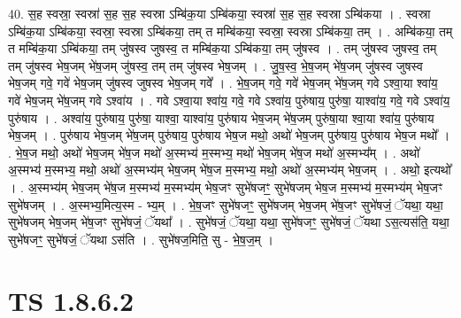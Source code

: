 \documentclass[17pt]{extarticle}
\begin{document}
40. स॒ह स्वस्रा॒ स्वस्रा॑ स॒ह स॒ह स्वस्रा ऽम्बि॑क॒या ऽम्बि॑कया॒ स्वस्रा॑ स॒ह स॒ह स्वस्रा ऽम्बि॑कया । . स्वस्रा ऽम्बि॑क॒या ऽम्बि॑कया॒ स्वस्रा॒ स्वस्रा ऽम्बि॑कया॒ तम् त मम्बि॑कया॒ स्वस्रा॒ स्वस्रा ऽम्बि॑कया॒ तम् । . अम्बि॑कया॒ तम् त मम्बि॑क॒या ऽम्बि॑कया॒ तम् जु॑षस्व जुषस्व॒ त मम्बि॑क॒या ऽम्बि॑कया॒ तम् जु॑षस्व । . तम् जु॑षस्व जुषस्व॒ तम् तम् जु॑षस्व भेष॒जम् भे॑ष॒जम् जु॑षस्व॒ तम् तम् जु॑षस्व भेष॒जम् । . जु॒ष॒स्व॒ भे॒ष॒जम् भे॑ष॒जम् जु॑षस्व जुषस्व भेष॒जम् गवे॒ गवे॑ भेष॒जम् जु॑षस्व जुषस्व भेष॒जम् गवे᳚ । . भे॒ष॒जम् गवे॒ गवे॑ भेष॒जम् भे॑ष॒जम् गवे ऽश्वा॒या श्वा॑य॒ गवे॑ भेष॒जम् भे॑ष॒जम् गवे ऽश्वा॑य । . गवे ऽश्वा॒या श्वा॑य॒ गवे॒ गवे ऽश्वा॑य॒ पुरु॑षाय॒ पुरु॑षा॒ याश्वा॑य॒ गवे॒ गवे ऽश्वा॑य॒ पुरु॑षाय । . अश्वा॑य॒ पुरु॑षाय॒ पुरु॑षा॒ याश्वा॒ याश्वा॑य॒ पुरु॑षाय भेष॒जम् भे॑ष॒जम् पुरु॑षा॒या श्वा॒या श्वा॑य॒ पुरु॑षाय भेष॒जम् । . पुरु॑षाय भेष॒जम् भे॑ष॒जम् पुरु॑षाय॒ पुरु॑षाय भेष॒ज मथो॒ अथो॑ भेष॒जम् पुरु॑षाय॒ पुरु॑षाय भेष॒ज मथो᳚ । . भे॒ष॒ज मथो॒ अथो॑ भेष॒जम् भे॑ष॒ज मथो॑ अ॒स्मभ्य॑ म॒स्मभ्य॒ मथो॑ भेष॒जम् भे॑ष॒ज मथो॑ अ॒स्मभ्य᳚म् । . अथो॑ अ॒स्मभ्य॑ म॒स्मभ्य॒ मथो॒ अथो॑ अ॒स्मभ्य॑म् भेष॒जम् भे॑ष॒ज म॒स्मभ्य॒ मथो॒ अथो॑ अ॒स्मभ्य॑म् भेष॒जम् । . अथो॒ इत्यथो᳚ । . अ॒स्मभ्य॑म् भेष॒जम् भे॑ष॒ज म॒स्मभ्य॑ म॒स्मभ्य॑म् भेष॒जꣳ सुभे॑षजꣳ॒॒ सुभे॑षजम् भेष॒ज म॒स्मभ्य॑ म॒स्मभ्य॑म् भेष॒जꣳ सुभे॑षजम् । . अ॒स्मभ्य॒मित्य॒स्म - भ्य॒म् । . भे॒ष॒जꣳ सुभे॑षजꣳ॒॒ सुभे॑षजम् भेष॒जम् भे॑ष॒जꣳ सुभे॑षजं॒ ॅयथा॒ यथा॒ सुभे॑षजम् भेष॒जम् भे॑ष॒जꣳ सुभे॑षजं॒ ॅयथा᳚ । . सुभे॑षजं॒ ॅयथा॒ यथा॒ सुभे॑षजꣳ॒॒ सुभे॑षजं॒ ॅयथा ऽस॒त्यस॑ति॒ यथा॒ सुभे॑षजꣳ॒॒ सुभे॑षजं॒ ॅयथा ऽस॑ति । . सुभे॑षज॒मिति॒ सु - भे॒ष॒ज॒म् । \newline
\pagebreak
{}

\section{ TS 1.8.6.2 }
\end{document}
